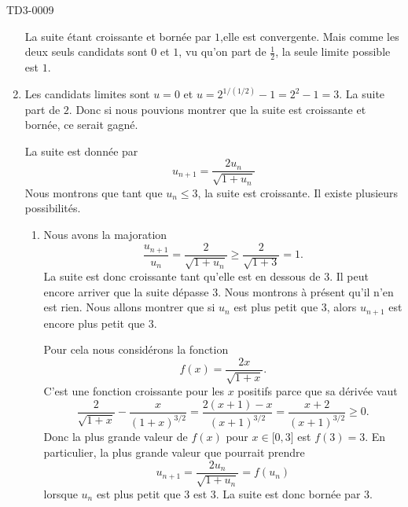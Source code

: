 \begin{corrige}{TD3-0009}
\begin{enumerate}
			La suite étant croissante et bornée par $1$,elle est convergente. Mais comme les deux seuls candidats sont $0$ et $1$, vu qu'on part de $\frac{ 1 }{2}$, la seule limite possible est $1$.
		\item
			Les candidats limites sont $u=0$ et $u=2^{1/(1/2)}-1=2^2-1=3$. La suite part de $2$. Donc si nous pouvions montrer que la suite est croissante et bornée, ce serait gagné.

			La suite est donnée par
			\begin{equation}
				u_{n+1}=\frac{ 2u_n }{ \sqrt{1+u_n} }
			\end{equation}
            Nous montrons que tant que \( u_n\leq 3\), la suite est croissante. Il existe plusieurs possibilités.

            \begin{enumerate}
                    \item
                Nous avons la majoration
                \begin{equation}        \label{Eqmaktzzzncn}
                    \frac{ u_{n+1} }{ u_n }=\frac{ 2 }{ \sqrt{1+u_n} }\geq \frac{ 2 }{ \sqrt{1+3} }=1.
                \end{equation}
                La suite est donc croissante tant qu'elle est en dessous de \( 3\). Il peut encore arriver que la suite dépasse \( 3\). Nous montrons à présent qu'il n'en est rien. Nous allons montrer que si \( u_n\) est plus petit que \( 3\), alors \( u_{n+1}\) est encore plus petit que \( 3\).

                Pour cela nous considérons la fonction
                \begin{equation}
                    f(x)=\frac{ 2x }{ \sqrt{1+x} }.
                \end{equation}
                C'est une fonction croissante pour les \( x\) positifs parce que sa dérivée vaut
                \begin{equation}
                    \frac{ 2 }{ \sqrt{1+x} }-\frac{ x }{ (1+x)^{3/2} }=\frac{ 2(x+1)-x }{ (x+1)^{3/2} }=\frac{ x+2 }{ (x+1)^{3/2} }\geq 0.
                \end{equation}
                Donc la plus grande valeur de \( f(x)\) pour \( x\in\mathopen[ 0 , 3 \mathclose]\) est \( f(3)=3\). En particulier, la plus grande valeur que pourrait prendre
                \begin{equation}
                    u_{n+1}=\frac{ 2u_n }{ \sqrt{1+u_n} }=f(u_n)
                \end{equation}
                lorsque \( u_n\) est plus petit que $3$ est \( 3\). La suite est donc bornée par \( 3\).
            

\end{enumerate}
\end{enumerate}
\end{corrige}

